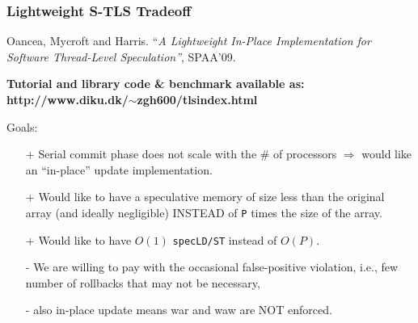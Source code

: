 \documentclass{beamer}
\newcommand{\emp}[1]{\textcolor{DikuRed}{ #1}}
\newcommand{\emphh}[1]{\textcolor{CosGreen}{ #1}}
\begin{document}
\begin{frame}[fragile,t]
  \frametitle{Lightweight S-TLS Tradeoff}

Oancea, Mycroft and Harris. 
``{\em A Lightweight In-Place Implementation for 
Software Thread-Level Speculation''}, SPAA'09.\medskip

{\bf Tutorial and library code \& benchmark available as:\\
http://www.diku.dk/$\sim$zgh600/tlsindex.html}\medskip

\bigskip

Goals:
\begin{itemize}
    \item[+] \emphh{Serial commit phase does not scale with the 
                \# of processors $\Rightarrow$ would like an ``in-place'' 
                update implementation.}\medskip
    \item[+] \emphh{Would like to have a speculative memory of size less than the
            original array (and ideally negligible) 
            INSTEAD of {\tt P} times the size of the array.}\medskip
    \item[+] \emphh{Would like to have $O(1)$ {\tt specLD/ST} instead of $O(P)$.}\medskip
    \item[-] \emp{We are willing to pay with the occasional 
                false-positive violation, i.e., few number of rollbacks
                that may not be necessary,} 
    \item[-] \emp{also in-place update means {\sc war} and {\sc waw} are NOT enforced}.
\end{itemize}

\end{frame}
\end{document}
